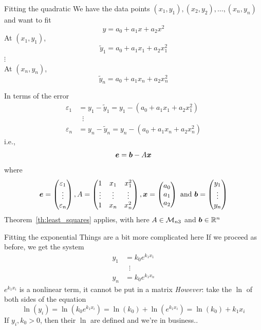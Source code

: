 \documentclass[aspectratio=169]{beamer}\usepackage[]{graphicx}\usepackage[]{xcolor}
\begin{document}
\begin{frame}{Fitting the quadratic}
We have the data points $(x_1,y_1),(x_2,y_2),\ldots,(x_n,y_n)$ and want to fit
\[
y = a_0+a_1x+a_2x^2
\]
At $(x_1,y_1)$,
\[
\tilde y_1 = a_0+a_1x_1+a_2x_1^2
\]
$\vdots$\\
At $(x_n,y_n)$,
\[
\tilde y_n = a_0+a_1x_n+a_2x_n^2
\]
\end{frame}

\begin{frame}
In terms of the error
\begin{align*}
\varepsilon_1 &= y_1-\tilde y_1 = y_1-(a_0+a_1x_1+a_2x_1^2) \\
&\;\;\vdots\\
\varepsilon_n &= y_n-\tilde y_n = y_n-(a_0+a_1x_n+a_2x_n^2)
\end{align*}
i.e.,
\[
\bm{e} = \bm{b}-A\bm{x} 
\]
where
\[
\bm{e} = \begin{pmatrix}
\varepsilon_1\\ \vdots\\ \varepsilon_n
\end{pmatrix},
A=\begin{pmatrix}
1 & x_1 & x_1^2\\ \vdots & \vdots & \vdots \\ 1 & x_n & x_n^2
\end{pmatrix},
\bm{x} = \begin{pmatrix}
a_0\\a_1\\a_2
\end{pmatrix}\textrm{ and }
\bm{b} = \begin{pmatrix}
y_1\\ \vdots\\ y_n
\end{pmatrix}
\]
\vfill
Theorem~\ref{th:least_squares} applies, with here $A\in\mathcal{M}_{n3}$ and $\bm{b}\in\mathbb{R}^n$
\end{frame}


\begin{frame}{Fitting the exponential}
Things are a bit more complicated here
\vfill
If we proceed as before, we get the system
\begin{align*}
y_1 &= k_0 e^{k_1x_1} \\
&\;\;\vdots \\
y_n &= k_0 e^{k_1x_n}
\end{align*}
$e^{k_1x_i}$ is a nonlinear term, it cannot be put in a matrix
\vfill
\emph{However}: take the $\ln$ of both sides of the equation
\[
\ln(y_i) = \ln(k_0e^{k_1x_i}) = \ln(k_0)+\ln(e^{k_1x_i}) = \ln(k_0)+k_1x_i
\]
If $y_i,k_0>0$, then their $\ln$ are defined and we're in business..
\end{frame}
\end{document}
